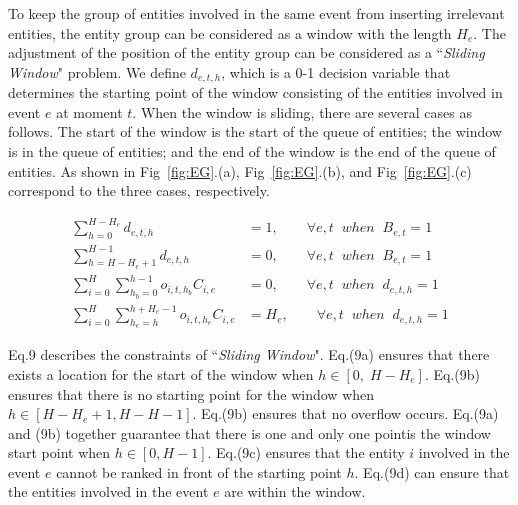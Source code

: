 \documentclass[review,journal]{vgtc}         %
\begin{document}
To keep the group of entities involved in the same event from inserting irrelevant entities, the entity group can be considered as a window with the length $H_e$. The adjustment of the position of the entity group can be considered as a ``\textit{Sliding Window}" problem. We define $d_{e,t,h}$, which is a 0-1 decision variable that determines the starting point of the window consisting of the entities involved in event $e$ at moment $t$. When the window is sliding, there are several cases as follows. The start of the window is the start of the queue of entities; the window is in the queue of entities; and the end of the window is the end of the queue of entities. As shown in Fig~\ref{fig:EG}.(a), Fig~\ref{fig:EG}.(b), and Fig~\ref{fig:EG}.(c) correspond to the three cases, respectively.

\vspace{-1em}
\begin{subequations}
	\begin{align}
	\sum_{h=0}^{H-H_e}d_{e,t,h}&=1, \quad\quad \forall e,t\;\; when\;\; B_{e,t} = 1\\
	\sum_{h=H-H_e+1}^{H-1}d_{e,t,h}&=0, \quad\quad \forall e,t\;\; when\;\; B_{e,t} = 1\\
	\sum_{i=0}^{H}\sum_{h_b=0}^{h-1}o_{i,t,h_b}C_{i,e}&=0, \quad\quad \forall e,t \;\;when\;\; d_{e,t,h}=1 \\
	\sum_{i=0}^{H}\sum_{h_e=h}^{h+H_e-1}o_{i,t,h_e}C_{i,e}&=H_e, \quad\quad \forall e,t \;\;when\;\; d_{e,t,h}=1
	\end{align}
\end{subequations}

Eq.9 describes the constraints of ``\textit{Sliding Window}". Eq.(9a) ensures that there exists a location for the start of the window when $h\in [0,\;H-H_e]$. Eq.(9b) ensures that there is no starting point for the window when $h\in [H-H_e+1,H-H-1]$. Eq.(9b) ensures that no overflow occurs. Eq.(9a) and (9b) together guarantee that there is one and only one pointis the window start point when $h\in[0, H-1]$. Eq.(9c) ensures that the entity $i$ involved in the event $e$ cannot be ranked in front of the starting point $h$. Eq.(9d) can ensure that the entities involved in the event $e$ are within the window.
\end{document}

